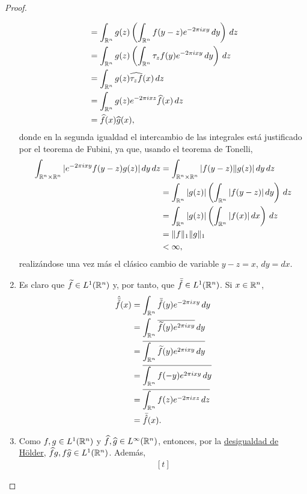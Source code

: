 \documentclass[a4paper, 11pt, oneside]{report}
\begin{document}
\begin{proof}
\begin{enumerate}
\[\begin{aligned}[t]
      &= \int_{\mathbb R^n} g(z)\left(\int_{\mathbb R^n}f(y-z)e^{-2\pi i xy} \, dy\right) \, dz \\
      &= \int_{\mathbb R^n} g(z)\left(\int_{\mathbb R^n}\tau_{z}f(y)e^{-2\pi i xy} \, dy\right) \, dz \\
      &= \int_{\mathbb R^n} g(z)\widehat{\tau_zf}(x) \, dz \\
      &= \int_{\mathbb R^n} g(z)e^{-2\pi i xz}\widehat{f}(x) \, dz \\
      &= \widehat{f}(x) \widehat{g}(x),
    \end{aligned}
    \]
    donde en la segunda igualdad el intercambio de las integrales está justificado por el teorema de Fubini, ya que, usando el teorema de Tonelli,
    \[
    \begin{aligned}[t]
      \int_{\mathbb R^n \times \mathbb R^n} |e^{-2\pi i xy} f(y-z)g(z)| \, dy \, dz &= \int_{\mathbb R^n \times \mathbb R^n} |f(y-z)\|g(z)| \, dy \, dz \\
      &= \int_{\mathbb R^n} |g(z)| \left(\int_{\mathbb R^n}|f(y-z)| \, dy\right) \, dz \\
      &= \int_{\mathbb R^n} |g(z)| \left(\int_{\mathbb R^n}|f(x)| \, dx \right) \, dz \\
      &= \|f\|_1 \|g\|_1 \\
      &< \infty,
    \end{aligned}
    \]
    realizándose una vez más el clásico cambio de variable $y - z = x$, $dy = dx$.
    \item Es claro que $\widetilde{f} \in L^1(\mathbb R^n)$ y, por tanto, que $\bar{\tilde{f}} \in L^1(\mathbb R^n)$. Si $x \in \mathbb R^n$,
    \[
    \begin{aligned}[t]
    \hat{\bar{\tilde{f}}}(x) &= \int_{\mathbb R^n} \bar{\tilde{f}}(y)e^{-2\pi i xy } \, dy \\
    &= \int_{\mathbb R^n} \overline{\widetilde{f}(y)e^{2\pi i xy }} \, dy \\
    &= \overline{\int_{\mathbb R^n}\widetilde{f}(y)e^{2\pi i xy} \, dy} \\
    &= \overline{\int_{\mathbb R^n}f(-y)e^{2\pi i xy} \, dy} \\
    &= \overline{\int_{\mathbb R^n}f(z)e^{-2\pi i xz} \, dz} \\
    &= \bar{\hat{f}}(x). \\
    \end{aligned}
    \]
    \item Como $f,g \in L^1(\mathbb R^n)$ y $\widehat{f}, \widehat{g} \in L^\infty(\mathbb R^n)$, entonces, por la \hyperref[cor:1.4.4]{\color{c1}desigualdad de Hölder}, $\widehat{f}g,f\widehat{g} \in L^1(\mathbb R^n)$. Además,
    \[
    \begin{aligned}[t]

\end{aligned}\]
\end{enumerate}
\end{proof}
\end{document}

